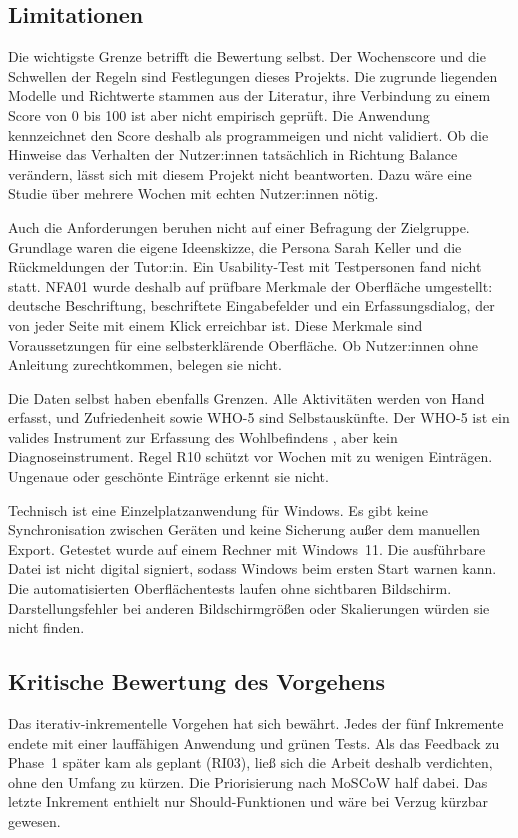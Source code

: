 \subsection{Limitationen}
Die wichtigste Grenze betrifft die Bewertung selbst. Der Wochenscore und die Schwellen der Regeln sind Festlegungen dieses Projekts. Die zugrunde liegenden Modelle und Richtwerte stammen aus der Literatur, ihre Verbindung zu einem Score von 0 bis 100 ist aber nicht empirisch geprüft. Die Anwendung kennzeichnet den Score deshalb als programmeigen und nicht validiert. Ob die Hinweise das Verhalten der Nutzer:innen tatsächlich in Richtung Balance verändern, lässt sich mit diesem Projekt nicht beantworten. Dazu wäre eine Studie über mehrere Wochen mit echten Nutzer:innen nötig.

Auch die Anforderungen beruhen nicht auf einer Befragung der Zielgruppe. Grundlage waren die eigene Ideenskizze, die Persona Sarah Keller und die Rückmeldungen der Tutor:in. Ein Usability-Test mit Testpersonen fand nicht statt. NFA01 wurde deshalb auf prüfbare Merkmale der Oberfläche umgestellt: deutsche Beschriftung, beschriftete Eingabefelder und ein Erfassungsdialog, der von jeder Seite mit einem Klick erreichbar ist. Diese Merkmale sind Voraussetzungen für eine selbsterklärende Oberfläche. Ob Nutzer:innen ohne Anleitung zurechtkommen, belegen sie nicht.

Die Daten selbst haben ebenfalls Grenzen. Alle Aktivitäten werden von Hand erfasst, und Zufriedenheit sowie WHO-5 sind Selbstauskünfte. Der WHO-5 ist ein valides Instrument zur Erfassung des Wohlbefindens \parencite[S.~167]{topp2015}, aber kein Diagnoseinstrument. Regel R10 schützt vor Wochen mit zu wenigen Einträgen. Ungenaue oder geschönte Einträge erkennt sie nicht.

Technisch ist \Projektname{} eine Einzelplatzanwendung für Windows. Es gibt keine Synchronisation zwischen Geräten und keine Sicherung außer dem manuellen Export. Getestet wurde auf einem Rechner mit Windows~11. Die ausführbare Datei ist nicht digital signiert, sodass Windows beim ersten Start warnen kann. Die automatisierten Oberflächentests laufen ohne sichtbaren Bildschirm. Darstellungsfehler bei anderen Bildschirmgrößen oder Skalierungen würden sie nicht finden.

\subsection{Kritische Bewertung des Vorgehens}
Das iterativ-inkrementelle Vorgehen hat sich bewährt. Jedes der fünf Inkremente endete mit einer lauffähigen Anwendung und grünen Tests. Als das Feedback zu Phase~1 später kam als geplant (RI03), ließ sich die Arbeit deshalb verdichten, ohne den Umfang zu kürzen. Die Priorisierung nach MoSCoW half dabei. Das letzte Inkrement enthielt nur Should-Funktionen und wäre bei Verzug kürzbar gewesen.

